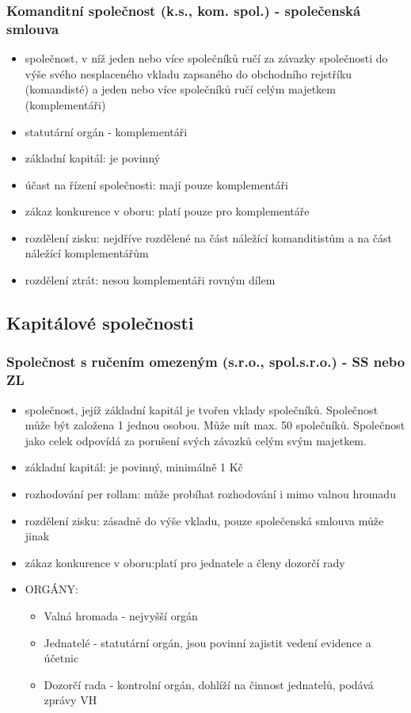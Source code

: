         \subsubsection{Komanditní společnost (k.s., kom. spol.) - společenská smlouva}
            \begin{itemize}
                \item společnost, v níž jeden nebo více společníků ručí za závazky společnosti do výše svého nesplaceného vkladu zapsaného do obchodního rejstříku (komandisté) a jeden nebo více společníků ručí celým majetkem (komplementáři)
                \item statutární orgán - komplementáři
                \item základní kapitál: je povinný
                \item účast na řízení společnosti: mají pouze komplementáři
                \item zákaz konkurence v oboru: platí pouze pro komplementáře
                \item rozdělení zisku: nejdříve rozdělené na část náležící komanditistům a na část náležící komplementářům
                \item rozdělení ztrát: nesou komplementáři rovným dílem
            \end{itemize}
    \subsection{Kapitálové společnosti}
        \subsubsection{Společnost s ručením omezeným (s.r.o., spol.s.r.o.) - SS nebo ZL}
            \begin{itemize}
                \item společnost, jejíž základní kapitál je tvořen vklady společníků. Společnost může být založena 1 jednou osobou. Může mít max. 50 společníků. Společnost jako celek odpovídá za porušení svých závazků celým svým majetkem.
                \item základní kapitál: je povinný, minimálně 1 Kč
                \item rozhodování per rollam: může probíhat rozhodování i mimo valnou hromadu
                \item rozdělení zisku: zásadně do výše vkladu, pouze společenská smlouva může jinak
                \item zákaz konkurence v oboru:platí pro jednatele a členy dozorčí rady					
                \item ORGÁNY:
                    \begin{itemize}
                        \item Valná hromada - nejvyšší orgán
                        \item Jednatelé - statutární orgán, jsou povinní zajistit vedení evidence a účetnic
                        \item Dozorčí rada - kontrolní orgán, dohlíží na činnost jednatelů, podává zprávy VH
                    \end{itemize}
            \end{itemize}
